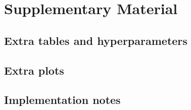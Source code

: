 \chapter{Supplementary Material}

\section{Extra tables and hyperparameters}

\section{Extra plots}

\section{Implementation notes}
